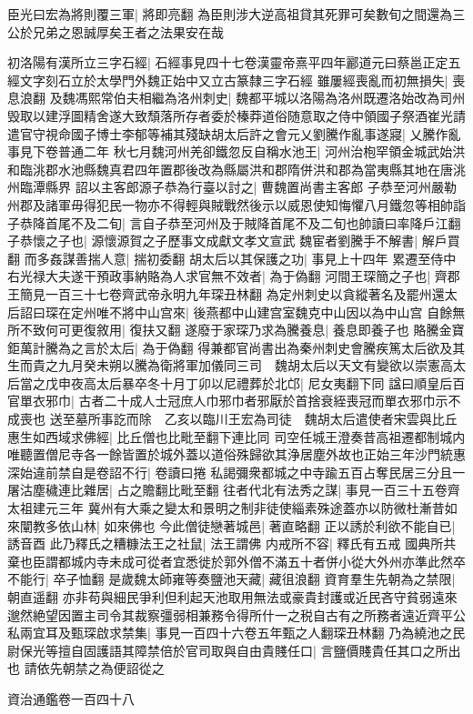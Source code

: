臣光曰宏為將則覆三軍|{
	將即亮翻}
為臣則涉大逆高祖貸其死罪可矣數旬之間還為三公於兄弟之恩誠厚矣王者之法果安在哉

初洛陽有漢所立三字石經|{
	石經事見四十七卷漢靈帝熹平四年酈道元曰蔡邕正定五經文字刻石立於太學門外魏正始中又立古篆隸三字石經}
雖屢經喪亂而初無損失|{
	喪息浪翻}
及魏馮熙常伯夫相繼為洛州刺史|{
	魏都平城以洛陽為洛州既遷洛始改為司州}
毁取以建浮圖精舍遂大致頹落所存者委於榛莽道俗随意取之侍中領國子祭酒崔光請遣官守視命國子博士李郁等補其殘缺胡太后許之會元乂劉騰作亂事遂寢|{
	乂騰作亂事見下卷普通二年}
秋七月魏河州羌卻鐵忽反自稱水池王|{
	河州治枹罕領金城武始洪和臨洮郡水池縣魏真君四年置郡後改為縣屬洪和郡隋併洪和郡為當夷縣其地在唐洮州臨潭縣界}
詔以主客郎源子恭為行臺以討之|{
	曹魏置尚書主客郎}
子恭至河州嚴勒州郡及諸軍毋得犯民一物亦不得輕與賊戰然後示以威恩使知悔懼八月鐵忽等相帥詣子恭降首尾不及二旬|{
	言自子恭至河州及于賊降首尾不及二旬也帥讀曰率降戶江翻}
子恭懷之子也|{
	源懷源賀之子歷事文成獻文孝文宣武}
魏宦者劉騰手不解書|{
	解戶買翻}
而多姦謀善揣人意|{
	揣初委翻}
胡太后以其保護之功|{
	事見上十四年}
累遷至侍中右光禄大夫遂干預政事納賂為人求官無不效者|{
	為于偽翻}
河間王琛簡之子也|{
	齊郡王簡見一百三十七卷齊武帝永明九年琛丑林翻}
為定州刺史以貪縱著名及罷州還太后詔曰琛在定州唯不將中山宫來|{
	後燕都中山建宫室魏克中山因以為中山宫}
自餘無所不致何可更復敘用|{
	復扶又翻}
遂廢于家琛乃求為騰養息|{
	養息即養子也}
賂騰金寶鉅萬計騰為之言於太后|{
	為于偽翻}
得兼都官尚書出為秦州刺史會騰疾篤太后欲及其生而貴之九月癸未朔以騰為衛將軍加儀同三司　魏胡太后以天文有變欲以崇憲高太后當之戊申夜高太后暴卒冬十月丁卯以尼禮葬於北邙|{
	尼女夷翻下同}
諡曰順皇后百官單衣邪巾|{
	古者二十成人士冠庶人巾邪巾者邪厭於首捨衰絰喪冠而單衣邪巾示不成喪也}
送至墓所事訖而除　乙亥以臨川王宏為司徒　魏胡太后遣使者宋雲與比丘惠生如西域求佛經|{
	比丘僧也比毗至翻下連比同}
司空任城王澄奏昔高祖遷都制城内唯聽置僧尼寺各一餘皆置於城外蓋以道俗殊歸欲其浄居塵外故也正始三年沙門統惠深始違前禁自是卷詔不行|{
	卷讀曰捲}
私謁彌衆都城之中寺踰五百占奪民居三分且一屠沽塵穢連比雜居|{
	占之贍翻比毗至翻}
往者代北有法秀之謀|{
	事見一百三十五卷齊太祖建元三年}
冀州有大乘之變太和景明之制非徒使緇素殊途蓋亦以防微杜漸昔如來闡教多依山林|{
	如來佛也}
今此僧徒戀著城邑|{
	著直略翻}
正以誘於利欲不能自已|{
	誘音酉}
此乃釋氏之糟糠法王之社鼠|{
	法王謂佛}
内戒所不容|{
	釋氏有五戒}
國典所共棄也臣謂都城内寺未成可從者宜悉徙於郭外僧不滿五十者併小從大外州亦準此然卒不能行|{
	卒子恤翻}
是歲魏太師雍等奏鹽池天藏|{
	藏徂浪翻}
資育羣生先朝為之禁限|{
	朝直遥翻}
亦非苟與細民爭利但利起天池取用無法或豪貴封護或近民吝守貧弱遠來邈然絶望因置主司令其裁察彊弱相兼務令得所什一之税自古有之所務者遠近齊平公私兩宜耳及甄琛啟求禁集|{
	事見一百四十六卷五年甄之人翻琛丑林翻}
乃為繞池之民尉保光等擅自固護語其障禁倍於官司取與自由貴賤任口|{
	言鹽價賤貴任其口之所出也}
請依先朝禁之為便詔從之

資治通鑑卷一百四十八
